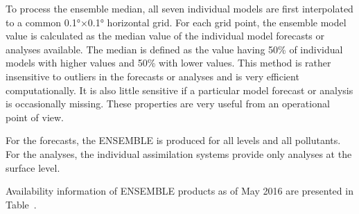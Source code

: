 \documentclass[9pt]{report}
\begin{document}
\noindent{}To process the ensemble median, all seven individual models are first interpolated to a common 0.1°×0.1° horizontal grid.
For each grid point, the ensemble model value is calculated as the median value of the individual model forecasts or analyses available.
The median is defined as the value having 50\% of individual models with higher values and 50\% with lower values.
This method is rather insensitive to outliers in the forecasts or analyses and is very efficient computationally.
It is also little sensitive if a particular model forecast or analysis is occasionally missing.
These properties are very useful from an operational point of view.%

For the forecasts, the ENSEMBLE is produced for all levels and all pollutants.
For the analyses, the individual assimilation systems provide only analyses at the surface level.%

Availability information of ENSEMBLE products as of May 2016 are presented in Table~.%

\begin{table}[h!]%
\begin{mdcenter}%
{}%
\end{mdcenter}\label{ensemble-portfolio}%
\end{table}%
\end{document}
